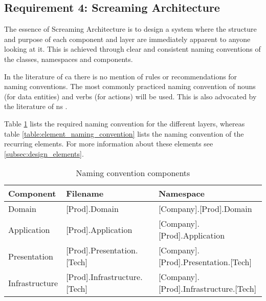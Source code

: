 \subsection{Requirement 4: Screaming Architecture}
The essence of Screaming Architecture is to design a system where the structure and
purpose of each component and layer are immediately apparent to anyone looking at it. This
is achieved through clear and consistent naming conventions of the classes, namespaces and
components.

In the literature of \gls{ca} there is no mention of rules or recommendations for naming
conventions. The most commonly practiced naming convention of nouns (for data entities)
and verbs (for actions) will be used. This is also advocated by the literature of \gls{ns}
\parencite[357]{mannaert_normalized_2016}.

Table \ref{table:component_naming_convention} lists the required naming convention for the
different layers, whereas table \ref{table:element_naming_convention} lists the naming
convention of the recurring elements. For more information about these elements see
\ref{subsec:design_elements}.

\begin{table}[h]
    \small
    \begin{tabular}{ |l|l|l| }
    \hline
    \textbf{Component} & \textbf{Filename} & \textbf{Namespace} \\ 
    \hline
    Domain & [Prod].Domain & [Company].[Prod].Domain \\
    \hline
    Application & [Prod].Application & [Company].[Prod].Application \\
    \hline
    Presentation & [Prod].Presentation.[Tech] & [Company].[Prod].Presentation.[Tech] \\
    \hline
    Infrastructure & [Prod].Infrastructure.[Tech] & [Company].[Prod].Infrastructure.[Tech] \\
    \hline
    \end{tabular}
    \caption{Naming convention components}
    \label{table:component_naming_convention}
    \end{table}

